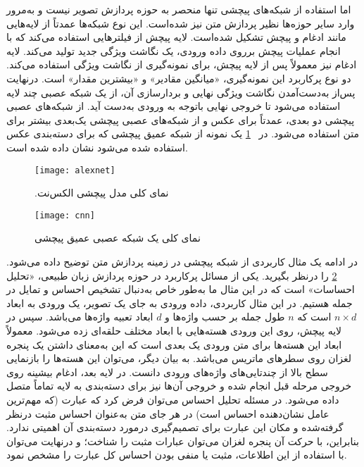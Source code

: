   
 اما استفاده از شبکه‌های
 پیچشی تنها منحصر به حوزه پردازش تصویر نیست و به‌مرور وارد سایر حوزه‌ها نظیر پردازش متن نیز شده‌است.
 این نوع شبکه‌ها عمدتاً از لایه‌هایی مانند ادغام و پیچش تشکیل شده‌است. لایه پیچش از فیلترهایی استفاده می‌کند که با
 انجام عملیات پیچش برروی داده ورودی، یک نگاشت ویژگی جدید تولید می‌کند. لایه ادغام نیز معمولاً پس از لایه پیچش،
 برای نمونه‌گیری از نگاشت ویژگی استفاده می‌کند. دو نوع پرکاربرد این نمونه‌گیری، «میانگین مقادیر» و «بیشترین مقدار» است. درنهایت پس‌از به‌دست‌آمدن نگاشت ویژگی نهایی و بردارسازی آن، از یک شبکه عصبی چند لایه استفاده می‌شود تا خروجی
 نهایی باتوجه ‌به ورودی به‌دست آید. از شبکه‌های عصبی پیچشی دو‌ بعدی، عمدتاً برای عکس و از شبکه‌های عصبی پیچشی یک‌بعدی بیشتر برای متن استفاده می‌شود. در \figurename~\ref{fig.alexnet} یک نمونه از شبکه عمیق پیچشی که برای دسته‌بندی عکس استفاده شده می‌شود نشان داده شده ‌است.

\begin{figure}[!h]
\texttt{[image: alexnet]}
\centering
\caption{.نمای کلی مدل پیچشی الکس‌نت \citep{krizhevsky2012imagenet}}
\label{fig.alexnet}
\end{figure}

\vspace{3mm}

\begin{figure}[!h]
\texttt{[image: cnn]}
\centering
\caption{نمای کلی یک شبکه عصبی عمیق پیچشی \citep{le2017convolutional}}
\label{fig.sentimentAnalyzing}
\end{figure}

در ادامه یک مثال کاربردی از شبکه پیچشی در زمینه پردازش متن توضیح داده می‌شود. \figurename~\ref{fig.sentimentAnalyzing} را درنظر بگیرید. یکی از مسائل  پرکاربرد در حوزه پردازش زبان طبیعی، «تحلیل احساسات» است که در این مثال ما به‌طور خاص  به‌دنبال تشخیص احساس و تمایل در جمله  هستیم. در این مثال کاربردی، داده ورودی به جای یک تصویر، یک ورودی به ابعاد  $n \times d$  است که $n$ طول جمله بر حسب واژه‌ها و $d$ ابعاد تعبیه واژه‌ها می‌باشد. سپس در لایه پیچش، روی این ورودی هسته‌هایی با ابعاد مختلف حلقه‌ای زده می‌شود. معمولاً ابعاد این هسته‌ها برای متن ورودی یک بعدی است که این به‌معنای داشتن یک پنجره لغزان روی سطرهای ماتریس می‌باشد. به بیان دیگر، می‌توان این هسته‌ها را بازنمایی سطح بالا از چندتایی‌های واژه‌های ورودی دانست. در لایه بعد، ادغام بیشینه روی خروجی مرحله قبل  انجام شده و خروجی آن‌ها نیز برای دسته‌بندی به لایه تماماً متصل داده می‌شود. در مسئله تحلیل احساس می‌توان فرض کرد که عبارت  (که مهم‌ترین عامل نشان‌دهنده احساس است)  در هر جای متن  به‌عنوان احساس مثبت درنظر گرفته‌شده و مکان این عبارت برای تصمیم‌گیری درمورد دسته‌بندی آن اهمیتی ندارد. بنابراین، با حرکت آن پنجره لغزان می‌توان عبارات مثبت را شناخت؛ و درنهایت می‌توان با استفاده از این اطلاعات، مثبت یا منفی بودن احساس کل عبارت را مشخص نمود.


